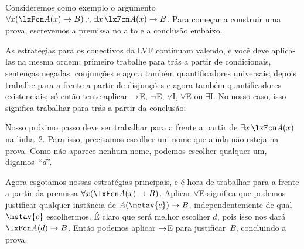 Consideremos como exemplo o argumento $\forall x(\atom{A}{x} \eif B) \therefore \exists x\,\atom{A}{x} \eif B$. Para começar a construir uma prova, escrevemos a premissa no alto e a conclusão embaixo.
\begin{fitchproof}
\PR
\ellipsesline
{}
\end{fitchproof}
As estratégias para os conectivos da LVF continuam valendo, e você deve aplicá-las na mesma ordem: primeiro trabalhe para trás a partir de condicionais, sentenças negadas, conjunções e agora também quantificadores universais; depois trabalhe para a frente a partir de disjunções e agora também quantificadores existenciais; só então tente aplicar $\rightarrow$E, $\neg$E, $\lor$I, $\forall$E ou $\exists$I. No nosso caso, isso significa trabalhar para trás a partir da conclusão:
\begin{fitchproof}
	\PR
	\open
	\AS
	\ellipsesline
	\close
\end{fitchproof}
Nosso próximo passo deve ser trabalhar para a frente a partir de $\exists x\,\atom{A}{x}$ na linha~$2$. Para isso, precisamos escolher um nome que ainda não esteja na prova. Como não aparece nenhum nome, podemos escolher qualquer um, digamos~\textquotedblleft $d$\textquotedblright{}.
\begin{fitchproof}
	\PR
	\open
	\AS
	\open
	\AS
	\ellipsesline
	\close
	\close
\end{fitchproof}
Agora esgotamos nossas estratégias principais, e é hora de trabalhar para a frente a partir da premissa $\forall x(\atom{A}{x} \eif B)$. Aplicar $\forall$E significa que podemos justificar qualquer instância de $A(\metav{c}) \eif B$, independentemente de qual $\metav{c}$ escolhermos. É claro que será melhor escolher $d$, pois isso nos dará $\atom{A}{d} \eif B$. Então podemos aplicar $\rightarrow$E para justificar~$B$, concluindo a prova.
\begin{fitchproof}
	\PR
	\open
	\AS
	\open
	\AS
{}
	\close
	\close
\end{fitchproof}

